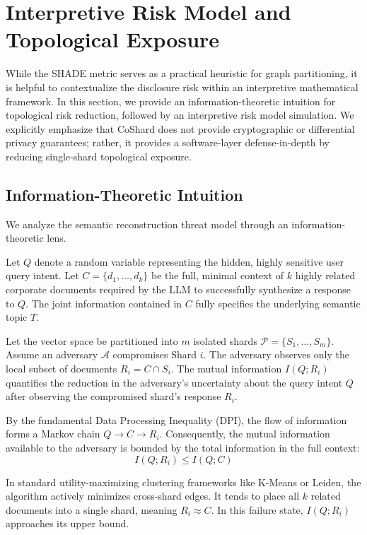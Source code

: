 \section{Interpretive Risk Model and Topological Exposure}
\label{sec:privacy_analysis}

While the SHADE metric serves as a practical heuristic for graph partitioning, it is helpful to contextualize the disclosure risk within an interpretive mathematical framework. In this section, we provide an information-theoretic intuition for topological risk reduction, followed by an interpretive risk model simulation. We explicitly emphasize that CoShard does not provide cryptographic or differential privacy guarantees; rather, it provides a software-layer defense-in-depth by reducing single-shard topological exposure.

\subsection{Information-Theoretic Intuition}
We analyze the semantic reconstruction threat model through an information-theoretic lens. 

Let $Q$ denote a random variable representing the hidden, highly sensitive user query intent. Let $C = \{d_1, \dots, d_k\}$ be the full, minimal context of $k$ highly related corporate documents required by the LLM to successfully synthesize a response to $Q$. The joint information contained in $C$ fully specifies the underlying semantic topic $T$.

Let the vector space be partitioned into $m$ isolated shards $\mathcal{P} = \{S_1, \dots, S_m\}$. Assume an adversary $\mathcal{A}$ compromises Shard $i$. The adversary observes only the local subset of documents $R_i = C \cap S_i$. The mutual information $I(Q ; R_i)$ quantifies the reduction in the adversary's uncertainty about the query intent $Q$ after observing the compromised shard's response $R_i$. 

By the fundamental Data Processing Inequality (DPI), the flow of information forms a Markov chain $Q \rightarrow C \rightarrow R_i$. Consequently, the mutual information available to the adversary is bounded by the total information in the full context:
\begin{equation}
I(Q; R_i) \leq I(Q; C)
\end{equation}

In standard utility-maximizing clustering frameworks like K-Means or Leiden, the algorithm actively minimizes cross-shard edges. It tends to place all $k$ related documents into a single shard, meaning $R_i \approx C$. In this failure state, $I(Q; R_i)$ approaches its upper bound.

